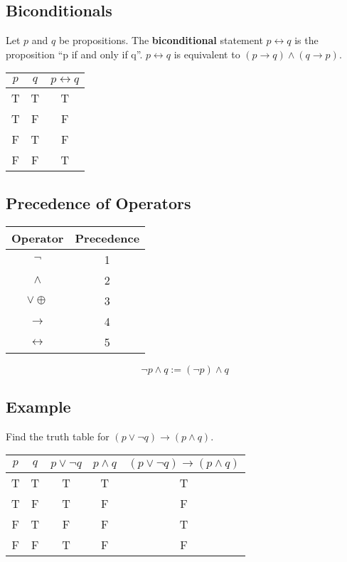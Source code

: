 \documentclass[letterpaper, 12pt]{math}
\begin{document}
\subsection*{Biconditionals}
Let \( p \) and \( q \) be propositions. The \textbf{biconditional} statement
\( p \leftrightarrow q \) is the proposition ``p if and only if q''.
\( p \leftrightarrow q \) is equivalent to \( (p \to q) \wedge (q \to p) \).
\begin{center}
  \begin{tabular}{|c|c|c|}
    \hline
    \( p \) & \( q \) & \( p \leftrightarrow q \) \\ \hline
    T & T & T \\ \hline
    T & F & F \\ \hline
    F & T & F \\ \hline
    F & F & T \\ \hline
  \end{tabular}
\end{center}

\subsection*{Precedence of Operators}
\begin{center}
  \begin{tabular}{|c|c|}
    \hline
    Operator              & Precedence \\ \hline
    \( \neg \)            & 1 \\ \hline
    \( \wedge \)          & 2 \\ \hline
    \( \vee \oplus \)     & 3 \\ \hline
    \( \to \)             & 4 \\ \hline
    \( \leftrightarrow \) & 5 \\ \hline
  \end{tabular}
\end{center}
\[ \neg{p} \wedge q := (\neg{p}) \wedge q \]

\subsection*{Example}
Find the truth table for \( (p \vee \neg{q}) \to (p \wedge q) \).
\begin{center}
  \begin{tabular}{|c|c|c|c|c|}
    \hline
    \( p \) & \( q \) & \( p \vee \neg{q} \) & \( p \wedge q \) &
    \( (p \vee \neg{q}) \to (p \wedge q) \) \\ \hline
    T & T & T & T & T \\ \hline
    T & F & T & F & F \\ \hline
    F & T & F & F & T \\ \hline
    F & F & T & F & F \\ \hline
  \end{tabular}
\end{center}
\end{document}
